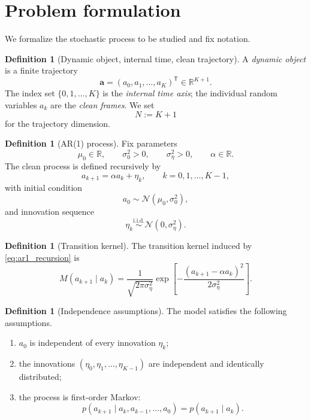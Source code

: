 \documentclass[11pt]{article}
\numberwithin{equation}{section}
\theoremstyle{definition}
\newtheorem{definition}[theorem]{Definition}
\theoremstyle{remark}
\newcommand{\R}{\mathbb{R}}
\newcommand{\trans}{\mathsf{T}}
\newcommand{\Ncal}{\mathcal{N}}
\begin{document}
\newpage
\tableofcontents
\newpage

\section{Problem formulation}\label{sec:problem}

We formalize the stochastic process to be studied and fix notation.

\begin{definition}[Dynamic object, internal time, clean trajectory]
A \emph{dynamic object} is a finite trajectory
\[
\mathbf{a}=(a_0,a_1,\dots,a_K)^\trans\in\R^{K+1}.
\]
The index set $\{0,1,\dots,K\}$ is the \emph{internal time axis}; the individual random variables $a_k$ are the \emph{clean frames}. We set
\[
N:=K+1
\]
for the trajectory dimension.
\end{definition}

\begin{definition}[AR(1) process]
Fix parameters
\[
\mu_0\in\R,\qquad \sigma_0^2>0,\qquad \sigma_\eta^2>0,\qquad \alpha\in\R.
\]
The clean process is defined recursively by
\begin{equation}\label{eq:ar1_recursion}
a_{k+1}=\alpha a_k+\eta_k,\qquad k=0,1,\dots,K-1,
\end{equation}
with initial condition
\begin{equation}\label{eq:a0_law}
a_0\sim \Ncal(\mu_0,\sigma_0^2),
\end{equation}
and innovation sequence
\begin{equation}\label{eq:innovations}
\eta_k \stackrel{\mathrm{i.i.d.}}{\sim}\Ncal(0,\sigma_\eta^2).
\end{equation}
\end{definition}

\begin{definition}[Transition kernel]
The transition kernel induced by \eqref{eq:ar1_recursion} is
\begin{equation}\label{eq:transition_kernel}
M(a_{k+1}\mid a_k)
=
\frac{1}{\sqrt{2\pi\sigma_\eta^2}}
\exp\!\left[-\frac{(a_{k+1}-\alpha a_k)^2}{2\sigma_\eta^2}\right].
\end{equation}
\end{definition}

\begin{definition}[Independence assumptions]
The model satisfies the following assumptions.
\begin{enumerate}[label=(\roman*),leftmargin=1.2cm]
\item $a_0$ is independent of every innovation $\eta_k$;
\item the innovations $(\eta_0,\eta_1,\dots,\eta_{K-1})$ are independent and identically distributed;
\item the process is first-order Markov:
\[
p(a_{k+1}\mid a_k,a_{k-1},\dots,a_0)=p(a_{k+1}\mid a_k).
\]
\end{enumerate}
\end{definition}
\end{document}

